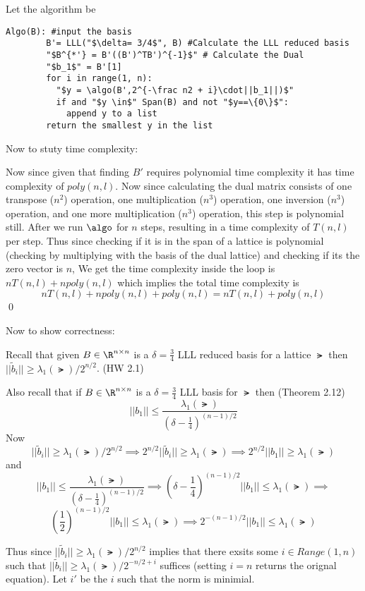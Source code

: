 \documentclass[12pt]{amsart}
\begin{document}
  \begin{problem}
    Let the algorithm be 
    \begin{lstlisting}[escapechar="]
      Algo(B): #input the basis
        B'= LLL("$\delta= 3/4$", B) #Calculate the LLL reduced basis
        "$B^{*'} = B'((B')^TB')^{-1}$" # Calculate the Dual
        "$b_1$" = B'[1] 
        for i in range(1, n):
          "$y = \algo(B',2^{-\frac n2 + i}\cdot||b_1||)$" 
          if and "$y \in$" Span(B) and not "$y==\{0\}$":
            append y to a list
        return the smallest y in the list
    \end{lstlisting}

    Now to stuty time complexity:

    Now since given that finding $B'$ requires polynomial time complexity it has time complexity of $poly(n,l).$ Now since calculating the dual matrix consists of one transpose ($n^2$) operation, one multiplication ($n^3$) operation, one inversion ($n^3$) operation, and one more multiplication ($n^3$) operation, this step is polynomial still. 
  After we run $\algo$ for $n$ steps, resulting in a time complexity of $T(n,l)$ per step. Thus since checking if it is in the span of a lattice is polynomial (checking by multiplying with the basis of the dual lattice) and checking if its the zero vector is $n$, We get the time complexity inside the loop is $nT(n,l) + n poly(n,l)$ which implies the total time complexity is 
\[nT(n,l)+ n poly(n,l) + poly(n,l) = nT(n,l)+poly(n,l)\]\qed


    Now to show correctness:

    Recall that given $B\in \R^{n\times n}$ is a $\delta=\frac34$ LLL reduced basis for a lattice $\lat$ then $||\tilde b_i||\geq \lambda_1(\lat)/2^{n/2}$. (HW 2.1)

    Also recall that if $B\in \R^{n\times n}$ is a $\delta=\frac34$ LLL basis for $\lat$ then (Theorem 2.12)
    \[||b_1||\leq \frac{\lambda_1(\lat)}{(\delta-\frac14)^{(n-1)/2}}\]
    Now 
    \[||\tilde b_i||\geq \lambda_1(\lat)/2^{n/2}\implies 2^{n/2}||\tilde b_i||\geq \lambda_1(\lat)\implies 2^{n/2}||b_1|| \geq \lambda_1(\lat)\]
    and 
    \[||b_1||\leq \frac{\lambda_1(\lat)}{(\delta-\frac14)^{(n-1)/2}}\implies (\delta-\frac14)^{(n-1)/2}||b_1||\leq \lambda_1(\lat)\implies\]
    \[(\frac12)^{(n-1)/2}||b_1||\leq \lambda_1(\lat)\implies 2^{-(n-1)/2}||b_1||\leq \lambda_1(\lat) \]


    Thus since $||\tilde b_i||\geq \lambda_1(\lat)/2^{n/2}$ implies that there exsits some $i\in Range(1, n)$ such that  $||\tilde b_i||\geq \lambda_1(\lat)/2^{-n/2+i}$ suffices (setting $i=n$ returns the orignal equation). Let $i'$ be the $i$ such that the norm is minimial. 


\end{problem}
\end{document}

